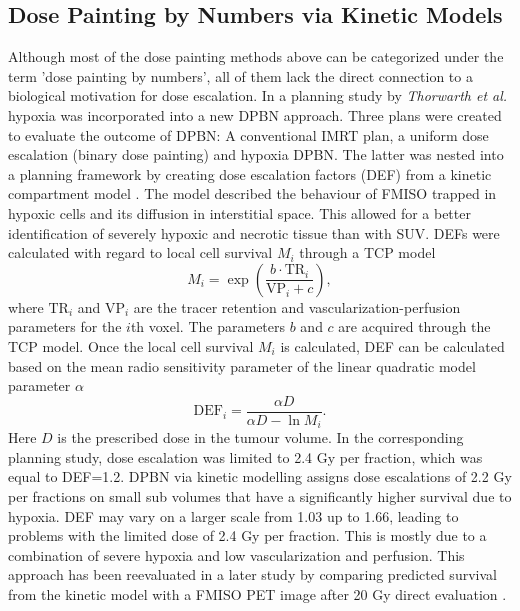\subsection{Dose Painting by Numbers via Kinetic Models}
Although most of the dose painting methods above can be categorized under the term 'dose painting by numbers', all of them lack the direct connection to a biological motivation for dose escalation. In a planning study by \textit{Thorwarth et al.} \cite{pmid17448882} hypoxia was incorporated into a new DPBN approach. Three plans were created to evaluate the outcome of DPBN: A conventional IMRT plan, a uniform dose escalation (binary dose painting) and hypoxia DPBN. The latter was nested into a planning framework by creating dose escalation factors (DEF) from a kinetic compartment model \cite{pmid15876662}. The model described the behaviour of FMISO trapped in hypoxic cells and its diffusion in interstitial space. This allowed for a better identification of severely hypoxic and necrotic tissue than with SUV. DEFs were calculated with regard to local cell survival $M_i$ through a TCP model \cite{pmid16321146}
\begin{equation}
M_i = \exp\left(\frac{b\cdot \mathrm{TR}_i}{\mathrm{VP}_i+c}\right),
\end{equation}
where $\mathrm{TR}_i$ and $\mathrm{VP}_i$ are the tracer retention and vascularization-perfusion parameters for the $i$th voxel. The parameters $b$ and $c$ are acquired through the TCP model. Once the local cell survival $M_i$ is calculated, DEF can be calculated based on the mean radio sensitivity parameter of the linear quadratic model parameter $\alpha$
\begin{equation}
\mathrm{DEF}_i = \frac{\alpha D}{\alpha D - \ln M_i}.
\end{equation}
Here $D$ is the prescribed dose in the tumour volume. In the corresponding planning study, dose escalation was limited to 2.4 Gy per fraction, which was equal to DEF=1.2. DPBN via kinetic modelling assigns dose escalations of 2.2 Gy per fractions on small sub volumes that have a significantly higher survival due to hypoxia. DEF may vary on a larger scale from 1.03 up to 1.66, leading to problems with the limited dose of 2.4 Gy per fraction. This is mostly due to a combination of severe hypoxia and low vascularization and perfusion. This approach has been reevaluated in a later study by comparing predicted survival from the kinetic model with a FMISO PET image after 20 Gy direct evaluation \cite{pmid18524387}.
